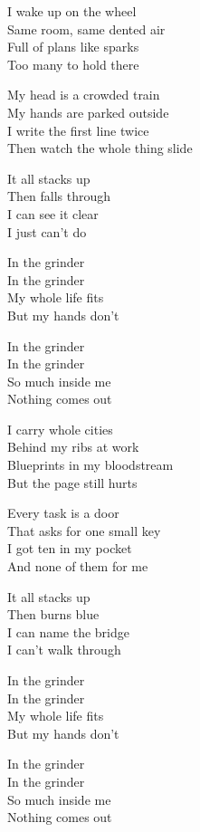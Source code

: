 \begin{lyrics}
I wake up on the wheel\\
Same room, same dented air\\
Full of plans like sparks\\
Too many to hold there

My head is a crowded train\\
My hands are parked outside\\
I write the first line twice\\
Then watch the whole thing slide

It all stacks up\\
Then falls through\\
I can see it clear\\
I just can't do

In the grinder\\
In the grinder\\
My whole life fits\\
But my hands don't

In the grinder\\
In the grinder\\
So much inside me\\
Nothing comes out

I carry whole cities\\
Behind my ribs at work\\
Blueprints in my bloodstream\\
But the page still hurts

Every task is a door\\
That asks for one small key\\
I got ten in my pocket\\
And none of them for me

It all stacks up\\
Then burns blue\\
I can name the bridge\\
I can't walk through

In the grinder\\
In the grinder\\
My whole life fits\\
But my hands don't

In the grinder\\
In the grinder\\
So much inside me\\
Nothing comes out


\end{lyrics}
